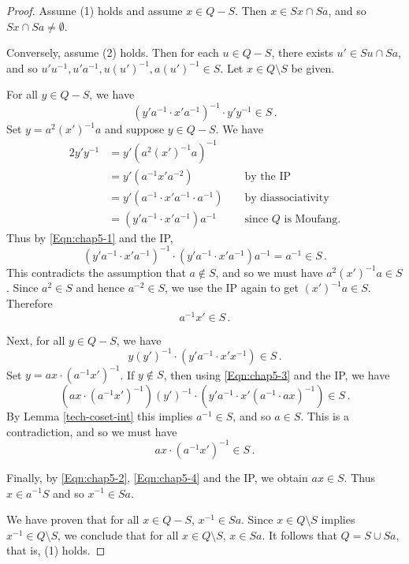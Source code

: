 \documentclass[12pt]{report}
\theoremstyle{definition}
\begin{document}
\begin{proof}
  Assume (1) holds and assume $x\in Q- S$. Then $x\in Sx\cap Sa$, and so $Sx\cap Sa\neq\emptyset$.
  
  Conversely, assume (2) holds. Then for each $u\in Q- S$, there exists $u'\in Su\cap Sa$, and
    so $u'u^{-1}, u'a^{-1}, u(u')^{-1}, a(u')^{-1}\in S$. Let $x\in Q\setminus S$ be given.
  
  For all $y\in Q- S$, we have
  \begin{equation}\label{Eqn:chap5-1}
  (y'a^{-1}\cdot x'a^{-1})^{-1}\cdot y'y^{-1}\in S\,.
  \end{equation}
  Set $y = a^2(x')^{-1}a$ and suppose $y\in Q- S$. 
  We have
  \begin{alignat*}{2}
  y'y^{-1}
      &= y'(a^2(x')^{-1}a)^{-1}               && \\
      &= y'(a^{-1}x'a^{-2})                   && \text{ by the IP} \\
      &= y'(a^{-1}\cdot x'a^{-1}\cdot a^{-1}) && \text{ by diassociativity} \\
      &= (y'a^{-1}\cdot x'a^{-1})a^{-1}       && \text{ since }Q\text{ is Moufang.}
  \end{alignat*}
  Thus by \eqref{Eqn:chap5-1} and the IP,
  \[
  (y'a^{-1}\cdot x'a^{-1})^{-1}\cdot (y'a^{-1}\cdot x'a^{-1})a^{-1} = a^{-1}\in S\,.
  \]
  This contradicts the assumption that $a\not\in S$, and so we must have $a^2(x')^{-1}a\in S$.
    Since $a^2\in S$ and hence $a^{-2}\in S$, we use the IP again to get $(x')^{-1}a\in S$. Therefore
  \begin{equation}\label{Eqn:chap5-2}
  a^{-1}x'\in S\,.
  \end{equation}
  
  Next, for all $y\in Q- S$, we have
  \begin{equation}\label{Eqn:chap5-3}
  y(y')^{-1}\cdot (y'a^{-1}\cdot x'x^{-1})\in S\,.
  \end{equation}
  Set $y = ax\cdot (a^{-1}x')^{-1}$. If $y\not\in S$, then using \eqref{Eqn:chap5-3} and the IP, we have
  \[
  (ax\cdot (a^{-1}x')^{-1})(y')^{-1}\cdot (y'a^{-1}\cdot x'(a^{-1}\cdot ax)^{-1})\in S\,.
  \]
  By Lemma \ref{tech-coset-int} this implies $a^{-1}\in S$, and so $a\in S$. This is a contradiction, and so we must
  have
  \begin{equation}\label{Eqn:chap5-4}
  ax\cdot (a^{-1}x')^{-1}\in S\,.
  \end{equation}
  
  Finally, by \eqref{Eqn:chap5-2}, \eqref{Eqn:chap5-4} and the IP, we obtain $ax\in S$. Thus $x\in a^{-1}S$
  and so $x^{-1}\in Sa$. 
  
  We have proven that for all $x\in Q- S$, $x^{-1}\in Sa$. Since $x\in Q\setminus S$ implies
    $x^{-1}\in Q\setminus S$, we conclude that for all $x\in Q\setminus S$, $x\in Sa$. It follows that
  $Q= S\cup Sa$, that is, (1) holds.
\end{proof}
\end{document}
